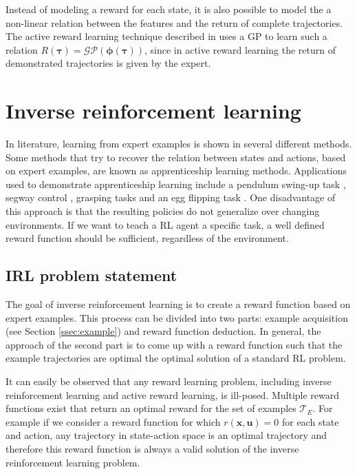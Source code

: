 \documentclass[mscThesis.tex]{subfiles}
\begin{document}
Instead of modeling a reward for each state, it is also possible to model the a non-linear relation between the features and the return of complete trajectories. The active reward learning technique described in \cite{Daniel2015} uses a GP to learn such a relation $R(\bm{\tau}) = \mathcal{GP}(\bm{\phi}(\bm{\tau}))$, since in active reward learning the return of demonstrated trajectories is given by the expert.


\section{Inverse reinforcement learning}
\label{sec:irl}
In literature, learning from expert examples is shown in several different methods. Some methods that try to recover the relation between states and actions, based on expert examples, are known as apprenticeship learning methods. Applications used to demonstrate apprenticeship learning include a pendulum swing-up task \cite{atkeson1997robot}, segway control \cite{browning2004skill}, grasping tasks \cite{sweeney2007model} and an egg flipping task \cite{pook1993recognizing}. One disadvantage of this approach is that the resulting policies do not generalize over changing environments. If we want to teach a RL agent a specific task, a well defined reward function should be sufficient, regardless of the environment.

\subsection{IRL problem statement}
The goal of inverse reinforcement learning is to create a reward function based on expert examples. This process can be divided into two parts: example acquisition (see Section \ref{ssec:example}) and reward function deduction. In general, the approach of the second part is to come up with a reward function such that the example trajectories are optimal the optimal solution of a standard RL problem. 

 It can easily be observed that any reward learning problem, including inverse reinforcement learning and active reward learning, is ill-posed. Multiple reward functions exist that return an optimal reward for the set of examples $\mathcal{T}_E$. For example if we consider a reward function for which $r(\bm{x}, \bm{u}) = 0$ for each state and action, any trajectory in state-action space is an optimal trajectory and therefore this reward function is always a valid solution of the inverse reinforcement learning problem. 
\end{document}
